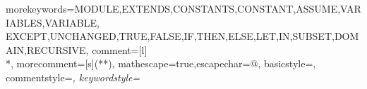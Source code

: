 \usepackage{mathpartir}
\usepackage{amsthm}
\usepackage{amsmath}
\usepackage{amssymb}
\usepackage{mathtools}
\usepackage{listings}
\usepackage{tlalatex}


  {morekeywords={MODULE,EXTENDS,CONSTANTS,CONSTANT,ASSUME,VARIABLES,VARIABLE,
          EXCEPT,UNCHANGED,TRUE,FALSE,IF,THEN,ELSE,LET,IN,SUBSET,DOMAIN,RECURSIVE},
          comment=[l]{\\*},
  morecomment=[s]{(*}{*)},
  mathescape=true,escapechar={@},
  basicstyle=\sffamily,%
  commentstyle=\itshape\rmfamily,%
  keywordstyle=\sffamily%
}


\newtheorem{theorem}{Theorem}[section]
\newtheorem{lemma}[theorem]{Lemma}
\newtheorem{corollary}[theorem]{Corollary}

\newcommand{\iteDef}[4]{
  #1 \coloneqq \left\{
\begin{array}{ll}
      #2 &; #3 \\
      #4 &; \text{otherwise}\\
\end{array} 
\right. 
}

\newcommand{\tlap}{$\textsc{TLA}^{+}$}

\newcommand{\nat}{\mathbb N_0}

\newcommand{\op}{\mathrm{Op}}
\newcommand{\nrop}{\mathrm{NonrecursiveOp}}
\newcommand{\mop}{\mathrm{mapOp}}
\newcommand{\mapg}{\mathrm{mapG}}

\newcommand{\tup}[1]{\left<\left<#1\right>\right>}
\newcommand{\htau}{\hat{\tau}}

\newcommand{\List}{\mathrm{List}}
\newcommand{\Seq}{\mathrm{Seq}}
\newcommand{\Set}{\mathrm{Set}}
\newcommand{\PVec}{\mathrm{PVec}}
\newcommand{\PSet}{\mathrm{PSet}}
\newcommand{\PMap}{\mathrm{PMap}}
\newcommand{\Concat}{\mathrm{Concat}}
\newcommand{\Callable}{\mathrm{Callable}}
\newcommand{\Le}{\mathrm{Le}}
\newcommand{\bool}{\mathrm{bool}}
\newcommand{\Bool}{\mathrm{Bool}}
\newcommand{\pyint}{\mathrm{int}}
\newcommand{\Int}{\mathrm{Int}}
\newcommand{\ApaFoldSet}{\mathrm{ApaFoldSet}}
\newcommand{\SetAsFun}{\mathrm{SetAsFun}}
\newcommand{\Push}{\mathrm{Push}}
\newcommand{\At}{\mathrm{At}}
\newcommand{\Indices}{\mathrm{Indices}}
\newcommand{\Chain}{\mathrm{Chain}}



